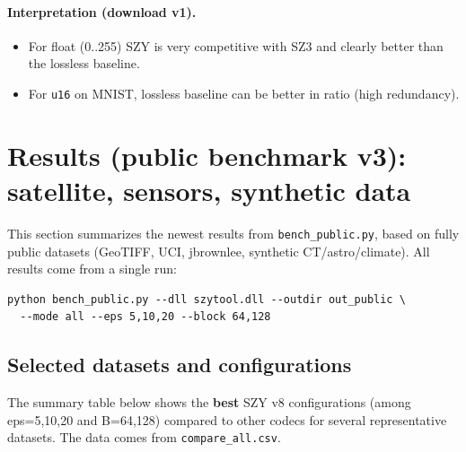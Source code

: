 \documentclass[11pt,a4paper]{article}
\begin{document}
\paragraph{Interpretation (download v1).}
\begin{itemize}
  \item For float (0..255) SZY is very competitive with SZ3 and clearly better than the lossless baseline.
  \item For \texttt{u16} on MNIST, lossless baseline can be better in ratio (high redundancy).
\end{itemize}

\section{Results (public benchmark v3): satellite, sensors, synthetic data}
\label{sec:public_bench_results}

This section summarizes the newest results from \texttt{bench\_public.py}, based on fully public datasets (GeoTIFF, UCI, jbrownlee, synthetic CT/astro/climate). All results come from a single run:

\begin{lstlisting}[style=txtstyle]
python bench_public.py --dll szytool.dll --outdir out_public \
  --mode all --eps 5,10,20 --block 64,128
\end{lstlisting}

\subsection{Selected datasets and configurations}
The summary table below shows the \textbf{best} SZY v8 configurations (among eps=5,10,20 and B=64,128) compared to other codecs for several representative datasets. The data comes from \texttt{compare\_all.csv}.
\end{document}
